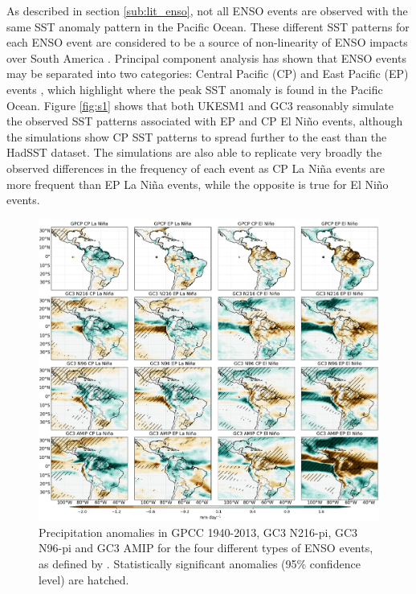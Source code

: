   
As described in section \ref{sub:lit_enso}, not all ENSO events are observed with the same SST anomaly pattern in the Pacific Ocean. These different SST patterns for each ENSO event are considered to be a source of non-linearity of ENSO impacts over South America \citep{sulca2018,cai2020}.
Principal component analysis has shown that ENSO events may be separated into two categories: Central Pacific (CP) and East Pacific (EP) events \citep{cai2020}, which highlight where the peak SST anomaly is found in the Pacific Ocean.
Figure \ref{fig:s1} shows that both UKESM1 and GC3 reasonably simulate the observed SST patterns associated with EP and CP El Niño events, although the simulations show CP SST patterns to spread further to the east than the HadSST dataset.
The simulations are also able to replicate very broadly the observed differences in the frequency of each event as CP La Niña events are more frequent than EP La Niña events, while the opposite is true for El Niño events.

\begin{figure}[t!]
\includegraphics[width=\linewidth]{figures/cppranomalies_ff}
\caption{Precipitation anomalies in GPCC 1940-2013, GC3 N216-pi, GC3 N96-pi and GC3 AMIP for the four different types of ENSO events, as defined by \cite{cai2020}. Statistically significant anomalies (95\% confidence level) are hatched.}
\label{fig:senso}
\end{figure}  

